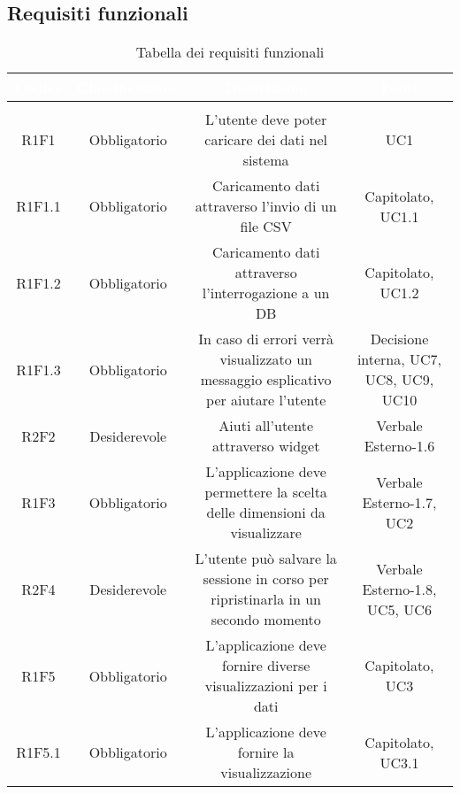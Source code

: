 \subsection{Requisiti funzionali}
\renewcommand{\arraystretch}{1.5}
\begin{center}
\begin{longtable}{C{\colA} C{\colB} C{\colC} C{\colA}}
		\textcolor{white}{\textbf{Codice}} & 
		\textcolor{white}{\textbf{Classificazione}} & 
		\textcolor{white}{\textbf{Descrizione}} & 
		\textcolor{white}{\textbf{Fonti}} \\
		\endfirsthead
	    \\
	    \endfoot
	    \caption{Tabella dei requisiti funzionali}
	    \endlastfoot

R1F1 & Obbligatorio & L'utente deve poter caricare dei dati nel sistema & UC1\\
R1F1.1 & Obbligatorio & Caricamento dati attraverso l'invio di un file CSV & Capitolato, UC1.1\\
R1F1.2 & Obbligatorio & Caricamento dati attraverso l'interrogazione a un DB & Capitolato, UC1.2\\
R1F1.3 & Obbligatorio & In caso di errori verrà visualizzato un messaggio esplicativo per aiutare l'utente & Decisione interna, UC7, UC8, UC9, UC10\\
R2F2 & Desiderevole & Aiuti all'utente attraverso widget & Verbale Esterno-1.6 \\
R1F3 & Obbligatorio & L'applicazione deve permettere la scelta delle dimensioni da visualizzare & Verbale Esterno-1.7, UC2\\
R2F4 & Desiderevole & L'utente può salvare la sessione in corso per ripristinarla in un secondo momento & Verbale Esterno-1.8, UC5, UC6\\
R1F5 & Obbligatorio & L'applicazione deve fornire diverse visualizzazioni per i dati & Capitolato, UC3\\

R1F5.1 & Obbligatorio & L'applicazione deve fornire la visualizzazione  & Capitolato, UC3.1\\


\end{longtable}
\end{center}
